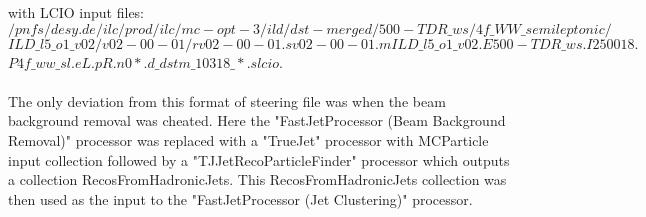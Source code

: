 with LCIO input files:\\
\texttt{$/pnfs/desy.de/ilc/prod/ilc/mc-opt-3/ild/dst-merged/500-TDR\_ws/4f\_WW\_semileptonic/$}
\texttt{$ILD\_l5\_o1\_v02/v02-00-01/rv02-00-01.sv02-00-01.mILD\_l5\_o1\_v02.E500-TDR\_ws.I250018.$}
\texttt{$P4f\_ww\_sl.eL.pR.n0*.d\_dstm\_10318\_*.slcio$}.
\\\\
The only deviation from this format of steering file was when the beam background removal was cheated. Here the "FastJetProcessor (Beam Background Removal)" processor was replaced with a "TrueJet" processor with MCParticle input collection followed by a "TJJetRecoParticleFinder" processor which outputs a collection RecosFromHadronicJets. This RecosFromHadronicJets collection was then used as the input to the "FastJetProcessor (Jet Clustering)" processor.

